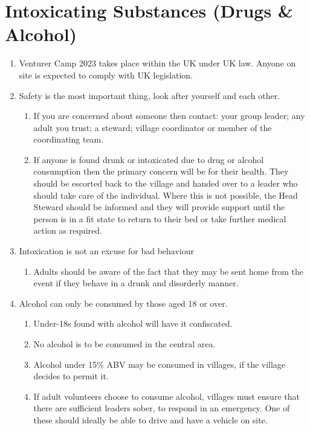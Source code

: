 \documentclass[a4paper, 11pt]{report}
\def\enumMarginIndentOne{4em}
\begin{document}
    \chapter{Intoxicating Substances (Drugs \& Alcohol)}
    \begin{enumerate}
        \item Venturer Camp 2023 takes place within the UK under UK law. Anyone on site is expected to comply with UK legislation.
        \item Safety is the most important thing, look after yourself and each other.
        \begin{enumerate}[leftmargin=\enumMarginIndentOne]
            \item If you are concerned about someone then contact:  your group leader; any adult you trust; a steward; village coordinator or member of the coordinating team.
            \item If anyone is found drunk or intoxicated due to drug or alcohol consumption then the primary concern will be for their health. They should be escorted back to the village and handed over to a leader who should take care of the individual. Where this is not possible, the Head Steward should be informed and they will provide support until the person is in a fit state to return to their bed or take further medical action as required.
        \end{enumerate}
        \item Intoxication is not an excuse for bad behaviour
        \begin{enumerate}[leftmargin=\enumMarginIndentOne]
            \item Adults should be aware of the fact that they may be sent home from the event if they behave in a drunk and disorderly manner. 
        \end{enumerate}
        \item Alcohol can only be consumed by those aged 18 or over.
        \begin{enumerate}[leftmargin=\enumMarginIndentOne]
            \item Under-18s found with alcohol will have it confiscated. 
            \item No alcohol is to be consumed in the central area.
            \item Alcohol under 15\% ABV may be consumed in villages, if the village decides to permit it.
            \item If adult volunteers choose to consume alcohol, villages must ensure that there are sufficient leaders sober, to respond in an emergency. One of these should ideally be able to drive and have a vehicle on site.

\end{enumerate}
\end{enumerate}
\end{document}
